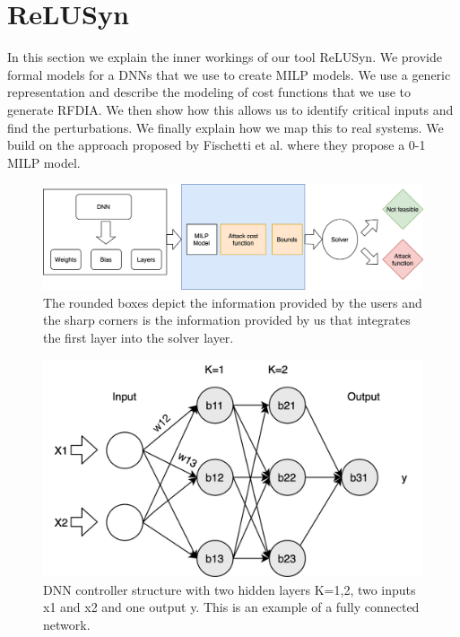 \chapter{ReLUSyn}
In this section we explain the inner workings of our tool ReLUSyn. 
We provide formal models for a \ac{DNN}s that we use to create \ac{MILP} models. 
We use a generic representation and describe the modeling of cost functions that we use to generate \ac{RFDIA}.
We then show how this allows us to identify critical inputs and find the perturbations. 
We finally explain how we map this to real systems. 
We build on the approach proposed by Fischetti et al. \cite{fischetti2017deep} where they propose a 0-1 MILP model. 
\begin{figure}
	\centering
	\includegraphics[scale=0.1]{Images/Methodology}
	\caption[Methodology]{The rounded boxes depict the information provided by the users and the sharp corners is the information provided by us that integrates the first layer into the solver layer.}
	\label{fig:methodology}
\end{figure}

\begin{figure}
	\centering
	\includegraphics[width=0.7\linewidth]{Images/DNNstructure}
	\caption[DNN structure]{DNN controller structure with two hidden layers K=1,2, two inputs x1 and x2 and one output y. This is an example of a fully connected network.}
	\label{fig:dnn-controller}
\end{figure}


